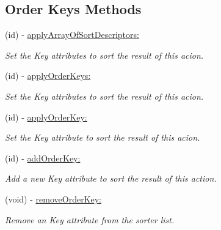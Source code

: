 \subsection*{Order Keys Methods}
\begin{DoxyCompactItemize}
\item 
(id) -\/ \hyperlink{interface_j_p_d_b_manager_action_ac7b38fbbab436a50344de7e5c61238b8}{applyArrayOfSortDescriptors:}
\begin{DoxyCompactList}\small\item\em Set the Key attributes to sort the result of this acion. \item\end{DoxyCompactList}\item 
(id) -\/ \hyperlink{interface_j_p_d_b_manager_action_aab038bf441025fe2d6615a49d67d6477}{applyOrderKeys:}
\begin{DoxyCompactList}\small\item\em Set the Key attributes to sort the result of this acion. \item\end{DoxyCompactList}\item 
(id) -\/ \hyperlink{interface_j_p_d_b_manager_action_a432c1012382e6baa4c76c051a524881e}{applyOrderKey:}
\begin{DoxyCompactList}\small\item\em Set the Key attribute to sort the result of this acion. \item\end{DoxyCompactList}\item 
(id) -\/ \hyperlink{interface_j_p_d_b_manager_action_a2ed39b1660529638ea1596cfea71580d}{addOrderKey:}
\begin{DoxyCompactList}\small\item\em Add a new Key attribute to sort the result of this action. \item\end{DoxyCompactList}\item 
(void) -\/ \hyperlink{interface_j_p_d_b_manager_action_a5ca5bdf039427760eb017fd51575d0e2}{removeOrderKey:}
\begin{DoxyCompactList}\small\item\em Remove an Key attribute from the sorter list. \item\end{DoxyCompactList}\end{DoxyCompactItemize}
